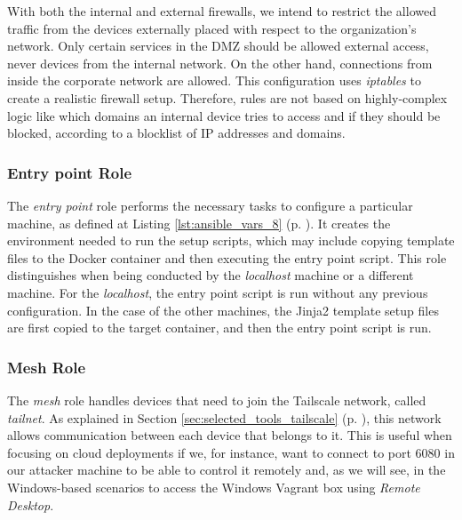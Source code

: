 With both the internal and external firewalls, we intend to restrict the allowed traffic from the devices externally placed with respect to the organization's network. Only certain services in the DMZ should be allowed external access, never devices from the internal network. On the other hand, connections from inside the corporate network are allowed. This configuration uses \textit{iptables} to create a realistic firewall setup. Therefore, rules are not based on highly-complex logic like which domains an internal device tries to access and if they should be blocked, according to a blocklist of IP addresses and domains.

\subsubsection{Entry point Role} \label{sec:ansible_entrypoint_role}

The \textit{entry point} role performs the necessary tasks to configure a particular machine, as defined at Listing \ref{lst:ansible_vars_8} (p. \pageref{lst:ansible_vars_8}). It creates the environment needed to run the setup scripts, which may include copying template files to the Docker container and then executing the entry point script. This role distinguishes when being conducted by the \textit{localhost} machine or a different machine. For the \textit{localhost}, the entry point script is run without any previous configuration. In the case of the other machines, the Jinja2 template setup files are first copied to the target container, and then the entry point script is run.

\subsubsection{Mesh Role} \label{sec:ansible_mesh_role}

The \textit{mesh} role handles devices that need to join the Tailscale network, called \textit{tailnet}. As explained in Section \ref{sec:selected_tools_tailscale} (p. \pageref{sec:selected_tools_tailscale}), this network allows communication between each device that belongs to it. This is useful when focusing on cloud deployments if we, for instance, want to connect to port 6080 in our attacker machine to be able to control it remotely and, as we will see, in the Windows-based scenarios to access the Windows Vagrant box using \textit{Remote Desktop}.

